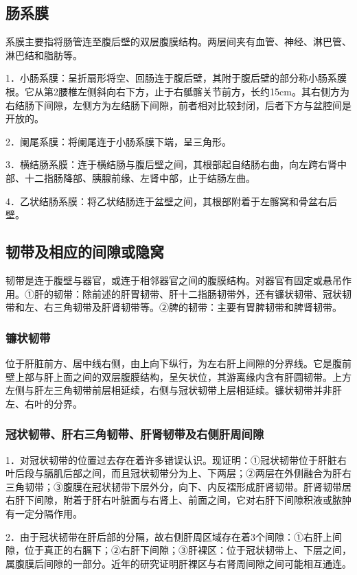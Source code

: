 \subsection{肠系膜}

系膜主要指将肠管连至腹后壁的双层腹膜结构。两层间夹有血管、神经、淋巴管、淋巴结和脂肪等。

1．小肠系膜：呈折扇形将空、回肠连于腹后壁，其附于腹后壁的部分称小肠系膜根。它从第2腰椎左侧斜向右下方，止于右骶髂关节前方，长约15cm。其右侧方为右结肠下间隙，左侧方为左结肠下间隙，前者相对比较封闭，后者下方与盆腔间是开放的。

2．阑尾系膜：将阑尾连于小肠系膜下端，呈三角形。

3．横结肠系膜：连于横结肠与腹后壁之间，其根部起自结肠右曲，向左跨右肾中部、十二指肠降部、胰腺前缘、左肾中部，止于结肠左曲。

4．乙状结肠系膜：将乙状结肠连于盆壁之间，其根部附着于左髂窝和骨盆右后壁。

\subsection{韧带及相应的间隙或隐窝}

韧带是连于腹壁与器官，或连于相邻器官之间的腹膜结构。对器官有固定或悬吊作用。①肝的韧带：除前述的肝胃韧带、肝十二指肠韧带外，还有镰状韧带、冠状韧带和左、右三角韧带及肝肾韧带等。②脾的韧带：主要有胃脾韧带和脾肾韧带。

\subsubsection{镰状韧带}

位于肝脏前方、居中线右侧，由上向下纵行，为左右肝上间隙的分界线。它是腹前壁上部与肝上面之间的双层腹膜结构，呈矢状位，其游离缘内含有肝圆韧带。上方左侧与肝左三角韧带前层相延续，右侧与冠状韧带上层相延续。镰状韧带并非肝左、右叶的分界。

\subsubsection{冠状韧带、肝右三角韧带、肝肾韧带及右侧肝周间隙}

1．对冠状韧带的位置过去存在着许多错误认识。现证明：①冠状韧带位于肝脏右叶后段与膈肌后部之间，而且冠状韧带分为上、下两层；②两层在外侧融合为肝右三角韧带；③腹膜在冠状韧带下层外分，向下、内反褶形成肝肾韧带。肝肾韧带居右肝下间隙，附着于肝右叶脏面与右肾上、前面之间，它对右肝下间隙积液或脓肿有一定分隔作用。

2．由于冠状韧带在肝后部的分隔，故右侧肝周区域存在着3个间隙：①右肝上间隙，位于真正的右膈下；②右肝下间隙；③肝裸区：位于冠状韧带上、下层之间，属腹膜后间隙的一部分。近年的研究证明肝裸区与右肾周间隙之间可能相互通连。

